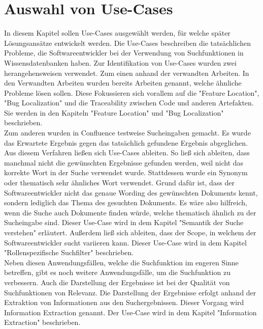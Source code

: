 \chapter{Auswahl von Use-Cases}
In diesem Kapitel sollen Use-Cases ausgewählt werden, für welche später Lösungsansätze entwickelt werden.
Die Use-Cases beschreiben die tatsächlichen Probleme, die Softwareentwickler bei der Verwendung von Suchfunktionen in Wissensdatenbanken haben.
Zur Identifikation von Use-Cases wurden zwei herangehensweisen verwendet.
Zum einen anhand der verwandten Arbeiten.
In den Verwandten Arbeiten wurden bereits Arbeiten genannt, welche ähnliche Probleme lösen sollen.
Diese Fokussieren sich vorallem auf die "Feature Location", "Bug Localization" und die Traceability zwischen Code und anderen Artefakten.
Sie werden in den Kapiteln "Feature Location" und "Bug Localization" beschrieben.\\

Zum anderen wurden in Confluence testweise Sucheingaben gemacht.
Es wurde das Erwartete Ergebnis gegen das tatsächlich gefundene Ergebnis abgeglichen.
Aus diesem Verfahren ließen sich Use-Cases ableiten.
So ließ sich ableiten, dass manchmal nicht die gewünschten Ergebnisse gefunden werden, weil nicht das korrekte Wort in der Suche verwendet wurde.
Stattdessen wurde ein Synonym oder thematisch sehr ähnliches Wort verwendet.
Grund dafür ist, dass der Softwareentwickler nicht das genaue Wording des gewünschten Dokuments kennt, sondern lediglich das Thema des gesuchten Dokuments.
Es wäre also hilfreich, wenn die Suche auch Dokumente finden würde, welche thematisch ähnlich zu der Sucheingabe sind.
Dieser Use-Case wird in dem Kapitel "Semantik der Suche verstehen" erläutert.
Außerdem ließ sich ableiten, dass der Scope, in welchem der Softwareentwickler sucht variieren kann.
Dieser Use-Case wird in dem Kapitel "Rollenspezifische Suchfilter" beschrieben.\\

Neben diesen Anwendungsfällen, welche die Suchfunktion im engeren Sinne betreffen, gibt es noch weitere Anwendungsfälle, um die Suchfunktion zu verbessern.
Auch die Darstellung der Ergebnisse ist bei der Qualität von Suchfunktionen von Relevanz.
Die Darstellung der Ergebnisse erfolgt anhand der Extraktion von Informationen aus den Suchergebnissen.
Dieser Vorgang wird Information Extraction genannt.
Der Use-Case wird in dem Kapitel "Information Extraction" beschrieben.

